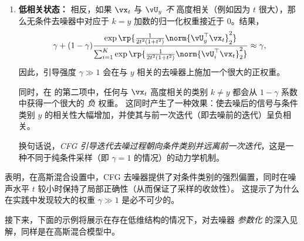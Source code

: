 \documentclass[../../book-main_zh.tex]{subfiles}
\begin{document}
\begin{example}
\begin{enumerate}
            这意味着：\textit{如果 CFG 去噪器的输入与某个类别子空间高度相关，则该去噪器近似等于相应的类条件去噪器}！因此，我们期望 CFG 去噪采样器能够收敛。
        \item \textbf{低相关状态：} 相反，如果 $\vx_t$ 与 $\vU_y$ \textit{不} 高度相关（例如因为 $t$ 很大），那么无条件去噪器中对应于 $k=y$ 加数的归一化权重接近于 $0$。结果，
            \begin{equation}
                \gamma + (1 - \gamma)
                \frac{\exp\rp{\frac{1}{2t^{2}(1
                + t^{2})}\norm{\vU_{y}^{\top}\vx_t}_{2}^{2}}}{\sum_{i
                    = 1}^{K}\exp\rp{\frac{1}{2t^{2}(1
                + t^{2})}\norm{\vU_{i}^{\top}\vx_t}_{2}^{2}}}
                \approx \gamma,
            \end{equation}
            因此，引导强度 $\gamma \gg 1$ 会在与 $y$ 相关的去噪器上施加一个很大的正权重。

            同时，在  的第二项中，任何与 $\vx_t$ 高度相关的类别 $k \neq y$ 都会从 $1 - \gamma$ 系数中获得一个很大的 \textit{负} 权重。
            这同时产生了一种效果：使去噪后的信号与条件类别 $y$ 的相关性大幅增加，并使其与前一次迭代（即去噪前的迭代）呈负相关。

            换句话说，\textit{CFG 引导迭代去噪过程朝向条件类别并远离前一次迭代}，这是一种不同于纯条件采样（即 $\gamma = 1$ 的情况）的动力学机制。
    \end{enumerate}
\end{example}

 表明，在高斯混合设置中，CFG 去噪器提供了对条件类别的强烈偏置，同时在噪声水平 $t$ 较小时保持了局部正确性（从而保证了采样的收敛性）。
这提示了为什么在实践中发现较大的权重 $\gamma \gg 1$ 是必不可少的。

接下来，下面的示例将展示在存在低维结构的情况下，对去噪器 \textit{参数化} 的深入见解，同样是在高斯混合模型中。
\end{document}
